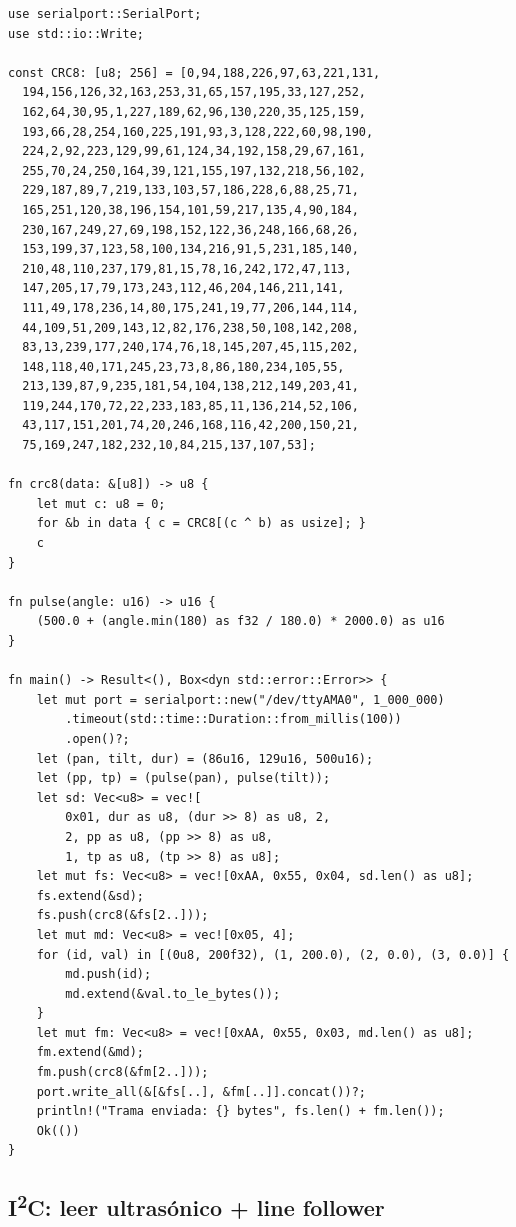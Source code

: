 \documentclass[11pt,a4paper]{article}
\begin{document}
\begin{lstlisting}[style=ruststyle]
use serialport::SerialPort;
use std::io::Write;

const CRC8: [u8; 256] = [0,94,188,226,97,63,221,131,
  194,156,126,32,163,253,31,65,157,195,33,127,252,
  162,64,30,95,1,227,189,62,96,130,220,35,125,159,
  193,66,28,254,160,225,191,93,3,128,222,60,98,190,
  224,2,92,223,129,99,61,124,34,192,158,29,67,161,
  255,70,24,250,164,39,121,155,197,132,218,56,102,
  229,187,89,7,219,133,103,57,186,228,6,88,25,71,
  165,251,120,38,196,154,101,59,217,135,4,90,184,
  230,167,249,27,69,198,152,122,36,248,166,68,26,
  153,199,37,123,58,100,134,216,91,5,231,185,140,
  210,48,110,237,179,81,15,78,16,242,172,47,113,
  147,205,17,79,173,243,112,46,204,146,211,141,
  111,49,178,236,14,80,175,241,19,77,206,144,114,
  44,109,51,209,143,12,82,176,238,50,108,142,208,
  83,13,239,177,240,174,76,18,145,207,45,115,202,
  148,118,40,171,245,23,73,8,86,180,234,105,55,
  213,139,87,9,235,181,54,104,138,212,149,203,41,
  119,244,170,72,22,233,183,85,11,136,214,52,106,
  43,117,151,201,74,20,246,168,116,42,200,150,21,
  75,169,247,182,232,10,84,215,137,107,53];

fn crc8(data: &[u8]) -> u8 {
    let mut c: u8 = 0;
    for &b in data { c = CRC8[(c ^ b) as usize]; }
    c
}

fn pulse(angle: u16) -> u16 {
    (500.0 + (angle.min(180) as f32 / 180.0) * 2000.0) as u16
}

fn main() -> Result<(), Box<dyn std::error::Error>> {
    let mut port = serialport::new("/dev/ttyAMA0", 1_000_000)
        .timeout(std::time::Duration::from_millis(100))
        .open()?;
    let (pan, tilt, dur) = (86u16, 129u16, 500u16);
    let (pp, tp) = (pulse(pan), pulse(tilt));
    let sd: Vec<u8> = vec![
        0x01, dur as u8, (dur >> 8) as u8, 2,
        2, pp as u8, (pp >> 8) as u8,
        1, tp as u8, (tp >> 8) as u8];
    let mut fs: Vec<u8> = vec![0xAA, 0x55, 0x04, sd.len() as u8];
    fs.extend(&sd);
    fs.push(crc8(&fs[2..]));
    let mut md: Vec<u8> = vec![0x05, 4];
    for (id, val) in [(0u8, 200f32), (1, 200.0), (2, 0.0), (3, 0.0)] {
        md.push(id);
        md.extend(&val.to_le_bytes());
    }
    let mut fm: Vec<u8> = vec![0xAA, 0x55, 0x03, md.len() as u8];
    fm.extend(&md);
    fm.push(crc8(&fm[2..]));
    port.write_all(&[&fs[..], &fm[..]].concat())?;
    println!("Trama enviada: {} bytes", fs.len() + fm.len());
    Ok(())
}
\end{lstlisting}

\subsection{I\textsuperscript{2}C: leer ultras\'{o}nico + line follower}
\end{document}
